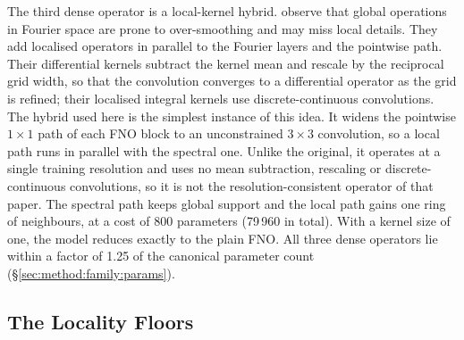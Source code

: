 The third dense operator is a local-kernel hybrid.
\citet{LiuSchiaffini2024} observe that global operations in Fourier
space are prone to over-smoothing and may miss local details. They add
localised operators in parallel to the Fourier layers and the pointwise
path. Their differential kernels subtract the kernel mean and rescale by the
reciprocal grid width, so that the convolution converges to a differential
operator as the grid is refined; their localised integral kernels use
discrete-continuous convolutions. The hybrid used here is the simplest
instance of this idea. It widens the pointwise $1 \times 1$ path of each FNO
block to an unconstrained $3 \times 3$ convolution, so a local path runs in
parallel with the spectral one. Unlike the original, it operates at a single
training resolution and uses no mean subtraction, rescaling or
discrete-continuous convolutions, so it is not the resolution-consistent
operator of that paper. The spectral path keeps
global support and the local path gains one ring of neighbours, at a cost
of 800 parameters (79\,960 in total). With a kernel size of one, the model
reduces exactly to the plain FNO. All three dense operators lie within a
factor of 1.25 of the canonical parameter count
(\S\ref{sec:method:family:params}).

\subsection{The Locality Floors}
\label{sec:method:family:floors}

